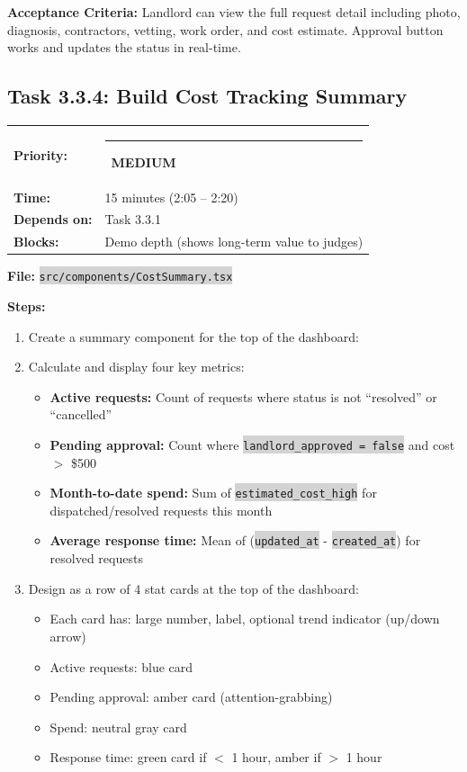 \documentclass[11pt, a4paper]{article}
\newcommand{\medpri}{\textcolor{medgreen}{\rule{6pt}{6pt}}~\textcolor{medgreen}{\scriptsize\textbf{MEDIUM}}}
\newcommand{\code}[1]{\texttt{\small\colorbox{lightgray}{#1}}}
\begin{document}
\textbf{Acceptance Criteria:} Landlord can view the full request detail including photo, diagnosis, contractors, vetting, work order, and cost estimate. Approval button works and updates the status in real-time.

\vspace{1em}

\subsection{Task 3.3.4: Build Cost Tracking Summary}

\begin{tabularx}{\textwidth}{lX}
\textbf{Priority:} & \medpri \\
\textbf{Time:} & 15 minutes (2:05 -- 2:20) \\
\textbf{Depends on:} & Task 3.3.1 \\
\textbf{Blocks:} & Demo depth (shows long-term value to judges) \\
\end{tabularx}

\vspace{0.3em}

\textbf{File:} \code{src/components/CostSummary.tsx}

\textbf{Steps:}
\begin{enumerate}[leftmargin=2em, itemsep=2pt]
  \item Create a summary component for the top of the dashboard:

  \item Calculate and display four key metrics:
    \begin{itemize}[itemsep=1pt]
      \item \textbf{Active requests:} Count of requests where status is not ``resolved'' or ``cancelled''
      \item \textbf{Pending approval:} Count where \code{landlord\_approved = false} and cost $>$ \$500
      \item \textbf{Month-to-date spend:} Sum of \code{estimated\_cost\_high} for dispatched/resolved requests this month
      \item \textbf{Average response time:} Mean of (\code{updated\_at} - \code{created\_at}) for resolved requests
    \end{itemize}

  \item Design as a row of 4 stat cards at the top of the dashboard:
    \begin{itemize}[itemsep=1pt]
      \item Each card has: large number, label, optional trend indicator (up/down arrow)
      \item Active requests: blue card
      \item Pending approval: amber card (attention-grabbing)
      \item Spend: neutral gray card
      \item Response time: green card if $<$ 1 hour, amber if $>$ 1 hour
    \end{itemize}
\end{enumerate}
\end{document}
